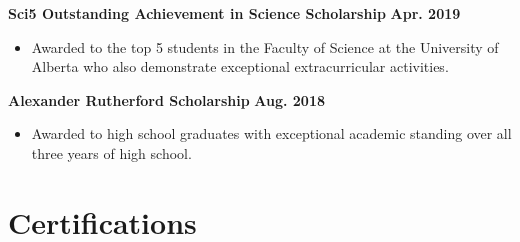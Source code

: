 \documentclass{article}
\begin{document}
\textbf{Sci5 Outstanding Achievement in Science Scholarship} \hfill \textbf{Apr. 2019}
    \begin{itemize}
        \item Awarded to the top 5 students in the Faculty of Science at the University of Alberta who also demonstrate exceptional extracurricular activities.
    \end{itemize}

\textbf{Alexander Rutherford Scholarship} \hfill \textbf{Aug. 2018}
    \begin{itemize}
        \item Awarded to high school graduates with exceptional academic standing over all three years of high school.
    \end{itemize}


\section*{\textcolor{my_colour}{Certifications}}
\vspace{-.25em} \hrulefill \vspace{.75em}
\end{document}
